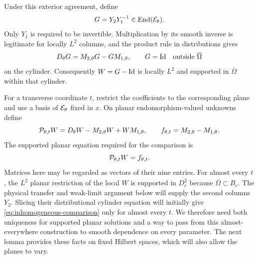 Under this exterior agreement, define
\[
 G=Y_2Y_1^{-1}\in\operatorname{End}(\mathcal E_\theta).
\]
Only $Y_1$ is required to be invertible. Multiplication by its smooth
inverse is legitimate for locally $L^2$ columns, and the product rule
in distributions gives
\[
 D_\theta G=M_{2,\theta}G-GM_{1,\theta},
 \qquad G=\mathrm{Id}\quad\text{outside }\overline\Omega
\]
on the cylinder. Consequently $W=G-\mathrm{Id}$ is locally $L^2$ and supported
in $\overline\Omega$ within that cylinder.

For a transverse coordinate $t$, restrict the coefficients to the
corresponding plane and use a basis of $\mathcal E_\theta$ fixed in $x$.
On planar endomorphism-valued unknowns define
\begin{equation}\label{eq:planar-comparison-operator}
 \mathcal P_{\theta,t}W
      =D_\theta W-M_{2,\theta}W+WM_{1,\theta},
 \qquad
 f_{\theta,t}=M_{2,\theta}-M_{1,\theta}.
\end{equation}
The supported planar equation required for the comparison is
\begin{equation}\label{eq:inhomogeneous-comparison}
 \mathcal P_{\theta,t}W=f_{\theta,t}.
\end{equation}
Matrices here may be regarded as vectors of their nine entries.
For almost every $t$, the $L^2$ planar restriction of the local $W$
is supported in $\overline{D_r^2}$ because $\overline\Omega\subset B_r$.
The physical transfer and weak-limit argument below will supply the
second columns $Y_2$. Slicing their distributional cylinder equation
will initially give \eqref{eq:inhomogeneous-comparison} only for almost
every $t$. We therefore need both uniqueness for supported planar
solutions and a way to pass from this almost-everywhere construction
to smooth dependence on every parameter. The next lemma provides these
facts on fixed Hilbert spaces, which will also allow the planes to vary.

